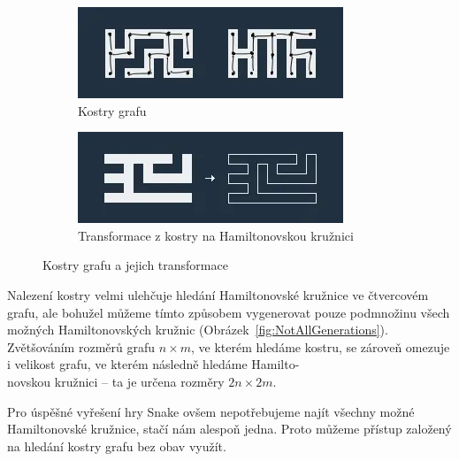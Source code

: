 \begin{figure}[!ht]
    \centering
    \begin{subfigure}[t]{0.45\textwidth}
        \centering
        \includegraphics[width=\textwidth]{Images/SpanningTreeSmallerGraph.png}
        \caption{Kostry grafu}
        \label{fig:SpanningTreeSmallerGraph}
    \end{subfigure}
    \hfill
    \begin{subfigure}[t]{0.45\textwidth}
        \centering
        \includegraphics[width=\textwidth]{Images/SpanningTreeToHamilton.png}
        \caption{Transformace z kostry na Hamiltonovskou kružnici}
        \label{fig:SpanningTreeToHamilton}
    \end{subfigure}
    \caption[Dostupné z: \url{https://miro.medium.com/v2/resize:fit:600/format:webp/1*kviW8mFsjXoLeOTdqTmbmA.png} \textbf{,}  \url{https://miro.medium.com/v2/resize:fit:600/format:webp/1*aB8mFapIsycDGVueoSpr1Q.png}]{Kostry grafu a jejich transformace}
\end{figure}

Nalezení kostry velmi ulehčuje hledání Hamiltonovské kružnice ve čtvercovém grafu, ale bohužel můžeme tímto způsobem vygenerovat pouze podmnožinu všech možných Hamiltonovských kružnic (Obrázek~\ref{fig:NotAllGenerations}). Zvětšováním rozměrů grafu \(n \times m\), ve kterém hledáme kostru, se zároveň omezuje i velikost grafu, ve kterém následně hledáme Hamilto-\\novskou kružnici – ta je určena rozměry \(2n \times 2m\).

Pro úspěšné vyřešení hry Snake ovšem nepotřebujeme najít všechny možné Hamiltonovské kružnice, stačí nám alespoň jedna. Proto můžeme přístup založený na hledání kostry grafu bez obav využít.

